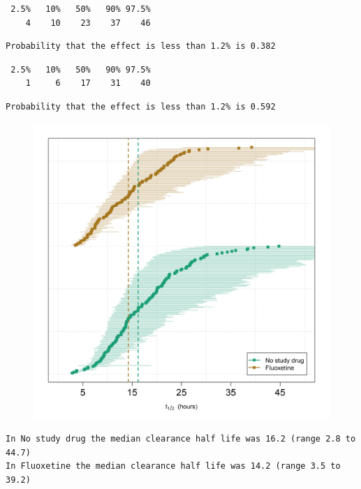 \documentclass[
  letterpaper,
  DIV=11,
  numbers=noendperiod]{scrartcl}
\begin{document}
\begin{verbatim}
 2.5%   10%   50%   90% 97.5% 
    4    10    23    37    46 
\end{verbatim}

\begin{verbatim}
Probability that the effect is less than 1.2% is 0.382
\end{verbatim}

\begin{verbatim}
 2.5%   10%   50%   90% 97.5% 
    1     6    17    31    40 
\end{verbatim}

\begin{verbatim}
Probability that the effect is less than 1.2% is 0.592
\end{verbatim}

\begin{figure}[H]

{\centering \includegraphics{Fluoxetine_analysis_files/figure-pdf/slopes_plot-1.png}

}

\end{figure}

\begin{verbatim}
In No study drug the median clearance half life was 16.2 (range 2.8 to 44.7)
In Fluoxetine the median clearance half life was 14.2 (range 3.5 to 39.2)
\end{verbatim}
\end{document}
